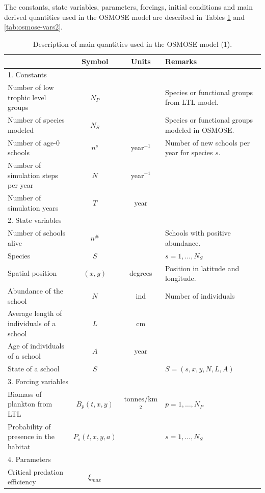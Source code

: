 The constants, state variables, parameters, forcings, initial conditions and main derived quantities used in the OSMOSE model are described in Tables \ref{tab:osmose-vars1} and \ref{tab:osmose-vars2}.


\begin{table}
\caption{Description of main quantities used in the OSMOSE model (1).}
\label{tab:osmose-vars1}
\centering \footnotesize 
\begin{tabular}{|p{5cm}|c|c|p{5cm}|}
\hline & Symbol & Units & Remarks\\
\hline \multicolumn{4}{|l|}{1. Constants}\\
\hline Number of low trophic level groups & $N_P$ &&	Species or functional groups from LTL model.\\
\hline Number of species modeled & $N_S$ && Species or functional groups modeled in OSMOSE.\\
\hline Number of age-0 schools & $n^s$ & year$^{-1}$ & Number of new schools per year for species $s$.\\
\hline Number of simulation steps per year	& $N$ &	year$^{-1}$ & \\
\hline Number of simulation years & $T$ & year &  \\
\hline \multicolumn{4}{|l|}{2. State variables}\\	
\hline Number of schools alive & $n^{\#}$ && Schools with positive abundance. \\
\hline Species	& $S$ && $s = 1, \ldots , N_S$\\
\hline Spatial position &	$(x,y)$ & degrees & Position in latitude and longitude.\\
\hline Abundance of the school & $N$ & ind & Number of individuals \\
\hline Average length of individuals of a school & $L$ &cm & \\	
\hline Age of individuals of a school & $A$ & year & \\	
\hline State of a school & $S$ && $S = (s, x, y, N, L, A)$ \\
\hline \multicolumn{4}{|l|}{3. Forcing variables}\\ 
\hline Biomass of plankton from LTL & $B_p(t,x,y)$	& tonnes/km$^2$ & $p = 1, \ldots, N_P$\\
\hline Probability of presence in the habitat & $P_s(t,x,y,a)$ &&	$s = 1, \ldots, N_S$\\
\hline \multicolumn{4}{|l|}{4. Parameters}\\
\hline Critical predation efficiency & $\xi_{max}$ && \\		

\end{tabular}
\end{table}
